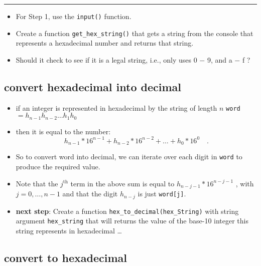 \documentclass[]{tufte-handout}
\providecommand{\tightlist}{%
  \setlength{\itemsep}{0pt}\setlength{\parskip}{0pt}}
\begin{document}
\begin{center}\rule{0.5\linewidth}{\linethickness}\end{center}

\begin{itemize}
\tightlist
\item
  For Step 1, use the \texttt{input()} function.
\item
  Create a function \texttt{get\_hex\_string()} that gets a string from
  the console that represents a hexadecimal number and returns that
  string.
\item
  Should it check to see if it is a legal string, i.e., only uses 0 − 9,
  and a − f ?
\end{itemize}

\subsection{convert hexadecimal into
decimal}\label{convert-hexadecimal-into-decimal}

\begin{itemize}
\tightlist
\item
  if an integer is represented in hexadecimal by the string of length
  \(n\) \texttt{word} \(= h_{n−1} h_{n−2} \dots h_1 h_0\)
\item
  then it is equal to the number: \[
  h_{n−1} * 16^{n−1} + h_{n−2} * 16^{n−2} + \dots + h_0 * 16^0 \quad .
  \]
\item
  So to convert word into decimal, we can iterate over each digit in
  \texttt{word} to produce the required value.
\item
  Note that the \(j^{\textrm{th}}\) term in the above sum is equal to
  \(h_{n−j−1} * 16^{n−j−1}\) , with \(j = 0, \dots, n − 1\) and that the
  digit \(h_{n−j}\) is just \texttt{word{[}j{]}}.
\item
  \textbf{next step}: Create a function
  \texttt{hex\_to\_decimal(hex\_String)} with string argument
  \texttt{hex\_string} that will returns the value of the base-10
  integer this string represents in hexadecimal \ldots{}
\end{itemize}

\subsection{convert to hexadecimal}\label{convert-to-hexadecimal}
\end{document}
